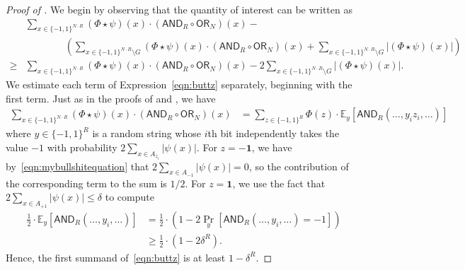 \documentclass[11pt, letterpaper, fleqn]{article}
\theoremstyle{plain}
\newcommand{\E}{\mathbb{E}}
\newcommand{\OR}{\mathsf{ OR}}
\newcommand{\bits}{\{-1,1\}}
\newcommand{\ls}{\star}
\newcommand{\AND}{\mathsf{AND}}
\begin{document}
\begin{proof}[Proof of ]
We begin by observing that the quantity of interest can be written as
\begin{align}
&\sum_{x \in \bits^{N \cdot R}}  ( \Phi \ls \psi)(x) \cdot \left(\AND_R \circ \OR_N\right)(x) - \nonumber \\
&\qquad\qquad \left( \sum_{x \in \bits^{N \cdot R} \setminus G} ( \Phi \ls \psi)(x) \cdot \left(\AND_R \circ \OR_N\right)(x) + \sum_{x \in\bits^{N \cdot R} \setminus G} |(\Phi \ls \psi)(x)| \right) \nonumber \\
\ge &\sum_{x \in \bits^{N \cdot R}}  ( \Phi \ls \psi)(x) \cdot \left(\AND_R \circ \OR_N\right)(x) - 2 \sum_{x \in \bits^{N \cdot R} \setminus G} |(\Phi \ls \psi)(x)|. \label{eqn:buttz}
\end{align}
We estimate each term of Expression~\eqref{eqn:buttz} separately, beginning with the first term. Just as in the proofs of  and , we have
\begin{align*}
\sum_{x \in \bits^{N \cdot R}} (\Phi \ls \psi)(x) \cdot (\AND_R \circ \OR_N)(x) &= \sum_{z \in \bits^R} \Phi(z) \cdot \E_y[\AND_R(\dots, y_i z_i, \dots)]
\end{align*}
where $y \in \bits^R$ is a random string whose $i$th bit independently takes the value $-1$ with probability $2 \sum_{x \in A_{z_i}} |\psi(x)|$. For $z = -\mathbf{1}$, we have by~\eqref{eqn:mybullshitequation} that $2 \sum_{x \in A_{-1}} |\psi(x)| = 0$, so the contribution of the corresponding term to the sum is $1/2$. For $z = \mathbf{1}$, we use the fact that $2 \sum_{x \in A_{+1}} |\psi(x)| \le \delta$ to compute
\begin{align*}
\frac{1}{2} \cdot \E_{y}[\AND_R(\dots, y_i, \dots)] &= \frac{1}{2} \cdot \left(1 - 2\Pr_y[\AND_R(\dots, y_i, \dots) = -1 ] \right) \\
&\ge \frac{1}{2} \cdot \left(1 - 2\delta^R\right).
\end{align*}
Hence, the first summand of~\eqref{eqn:buttz} is at least $1-\delta^R$.


\end{proof}
\end{document}

